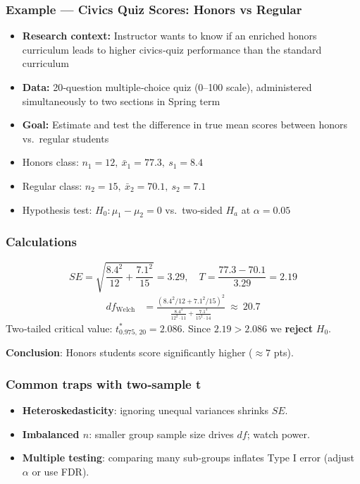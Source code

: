 \documentclass[handout]{beamer}
\begin{document}
\begin{frame}
\frametitle{Example — Civics Quiz Scores: Honors vs Regular}
\small
\begin{itemize}
    \item \textbf{Research context:} Instructor wants to know if an enriched honors curriculum leads to higher civics‐quiz performance than the standard curriculum  
    \item \textbf{Data:} 20‐question multiple‐choice quiz (0–100 scale), administered simultaneously to two sections in Spring term  
    \item \textbf{Goal:} Estimate and test the difference in true mean scores between honors vs.\ regular students  
    \item Honors class: \(n_1=12,\ \bar x_1=77.3,\ s_1=8.4\)  
    \item Regular class: \(n_2=15,\ \bar x_2=70.1,\ s_2=7.1\)  
    \item Hypothesis test: \(H_0: \mu_1-\mu_2 = 0\) vs.\ two‑sided \(H_a\) at \(\alpha=0.05\)
\end{itemize}
\end{frame}


\begin{frame}
\frametitle{Calculations}

\[
SE=\sqrt{\frac{8.4^2}{12}+\frac{7.1^2}{15}}=3.29, 
\quad T=\frac{77.3-70.1}{3.29}=2.19
\]
\vspace{-0.3em}
\begin{align*}
df_{\text{Welch}} &=
\frac{(8.4^2/12 + 7.1^2/15)^2}{\tfrac{8.4^4}{12^2\cdot11} + \tfrac{7.1^4}{15^2\cdot14}}
\ \approx\ 20.7
\end{align*}
Two‑tailed critical value: \(t^{\ast}_{0.975,\,20}=2.086\).  
Since \(2.19>2.086\) we \textbf{reject} \(H_0\).
\vspace{0.3em}

\textbf{Conclusion}: Honors students score significantly higher ($\approx7$ pts).
\end{frame}

\begin{frame}
\frametitle{Common traps with two‑sample t}
\begin{itemize}
  \item \textbf{Heteroskedasticity}: ignoring unequal variances shrinks \(SE\).  
  \item \textbf{Imbalanced $n$}: smaller group sample size drives \(df\); watch power.  
  \item \textbf{Multiple testing}: comparing many sub‑groups inflates Type I error (adjust \(\alpha\) or use FDR).
\end{itemize}
\end{frame}
\end{document}
